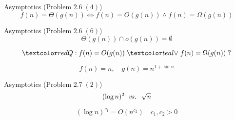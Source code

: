 \begin{frame}{}
  \begin{exampleblock}{Asymptotics (Problem $2.6\; (4)$)}
    \[
      f(n) = \Theta(g(n)) \iff f(n) = O(g(n)) \land f(n) = \Omega(g(n))
    \]
  \end{exampleblock}


  \pause
  \vspace{0.50cm}
  \begin{exampleblock}{Asymptotics (Problem $2.6\; (6)$)}
    \[
      \Theta(g(n)) \cap o(g(n)) = \emptyset
    \]
  \end{exampleblock}

  \pause
  \vspace{0.30cm}
  \[
    \red{Q:}\; f(n) = O(g(n)) \;\teal{\lor}\; f(n) = \Omega(g(n)) \;?
  \]

  \pause
  \[
    f(n) = n, \quad g(n) = n^{1 + \sin n}
  \]
\end{frame}

\begin{frame}{}
  \begin{exampleblock}{Asymptotics (Problem $2.7\; (2)$)}
    \[
      (\log n)^{2} \;\;\text{\it vs. }\; \sqrt{n}
    \]
  \end{exampleblock}

  \pause
  \[
    (\log n)^{c_1} = O(n^{c_2}) \quad c_1, c_2 > 0
  \]
\end{frame}

% 
% 
% 

